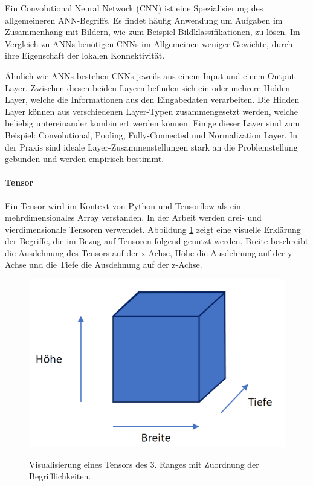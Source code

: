 \label{cnn}

Ein Convolutional Neural Network (CNN) ist eine Spezialisierung des allgemeineren ANN-Begriffs. Es findet häufig  Anwendung um Aufgaben im Zusammenhang mit Bildern, wie zum Beispiel Bildklassifikationen, zu lösen. Im Vergleich zu ANNs benötigen CNNs im Allgemeinen weniger Gewichte, durch ihre Eigenschaft der lokalen Konnektivität.

Ähnlich wie ANNs bestehen CNNs jeweils aus einem Input und einem Output Layer. Zwischen diesen beiden Layern befinden sich ein oder mehrere Hidden Layer, welche die Informationen aus den Eingabedaten verarbeiten. Die Hidden Layer können aus verschiedenen Layer-Typen zusammengesetzt werden, welche beliebig untereinander kombiniert werden können. Einige dieser Layer sind zum Beispiel: Convolutional, Pooling, Fully-Connected und Normalization Layer. In der Praxis sind ideale Layer-Zusammenstellungen stark an die Problemstellung gebunden und werden empirisch bestimmt. 

\paragraph{Tensor}

Ein Tensor wird im Kontext von Python und Tensorflow als ein mehrdimensionales Array verstanden. In der Arbeit werden drei- und vierdimensionale Tensoren verwendet. Abbildung \ref{fig:bth} zeigt eine visuelle Erklärung der Begriffe, die im Bezug auf Tensoren folgend genutzt werden. Breite beschreibt die Ausdehnung des Tensors auf der x-Achse, Höhe die Ausdehnung auf der y-Achse und die Tiefe die Ausdehnung auf der z-Achse. 

\begin{figure}[H]
\centering
\includegraphics[scale=0.4]{pictures/grafiken/bht-erlk}
\label{fig:bth}
\caption{Visualisierung eines Tensors des 3. Ranges mit Zuordnung der Begrifflichkeiten.}
\end{figure}


